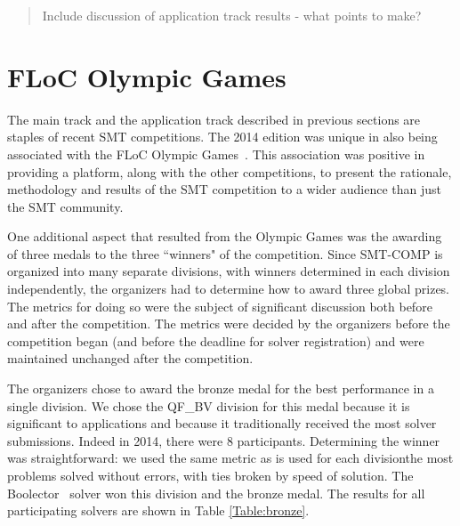 \documentclass[twoside,11pt]{article}
\newcommand{\comment}[2]{\begin{quote}\sc #1\marginpar{\textcolor{red}{$\ast^{\mbox{#2}}$}}\end{quote}}
\newcommand{\davidc}[1]{\comment{#1}{DC}}
\begin{document}
\davidc{Include discussion of application track results - what points to make?}

\section{FLoC Olympic Games}
\label{sec:floc}

The main track and the application track described in previous sections are staples of recent SMT competitions. The 2014 edition was unique in also being associated with the FLoC Olympic Games~\cite{FLoCGames}.
This association was positive in providing a platform, along with the other competitions, to present the
rationale, methodology and results of the SMT competition to a wider audience than just the SMT community.

One additional aspect that resulted from the Olympic Games was the awarding of three medals to the three ``winners" of the competition. Since SMT-COMP is organized into many separate divisions, with winners determined in each division independently, the organizers had to determine how to award three global prizes.
The metrics for doing so were the subject of significant discussion both before and after the competition.
The metrics were decided by the organizers before the competition began (and before the deadline for solver registration) and were maintained unchanged after the competition.

The organizers chose to award the bronze medal for the best performance in a single division. We chose  the QF\_BV division for this medal because it is significant to applications and because it traditionally received the most solver submissions. Indeed in 2014, there were 8 participants. Determining the winner was straightforward: we used the same metric as is used for each division\textemdash the most problems solved without errors, with ties broken by speed of solution. The Boolector~\cite{boolector} solver won this division and the bronze medal. The results for all participating solvers are shown in Table \ref{Table:bronze}.
\end{document}
